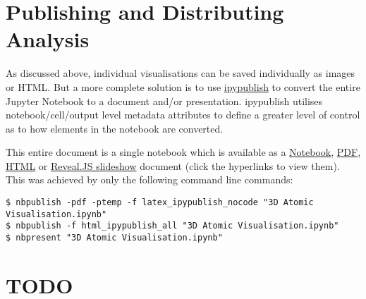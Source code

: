 \documentclass[10pt,parskip=half,
	toc=sectionentrywithdots,
	bibliography=totocnumbered,
	captions=tableheading,numbers=noendperiod]{scrartcl}
\begin{document}
\section{Publishing and Distributing
Analysis}\label{publishing-and-distributing-analysis}

As discussed above, individual visualisations can be saved individually
as images or HTML. But a more complete solution is to use
\href{https://github.com/chrisjsewell/ipypublish}{ipypublish} to convert
the entire Jupyter Notebook to a document and/or presentation.
ipypublish utilises notebook/cell/output level metadata attributes to
define a greater level of control as to how elements in the notebook are
converted.

This entire document is a single notebook which is available as a
\href{https://github.com/chrisjsewell/chrisjsewell.github.io/blob/master/3d_atomic/3D\%20Atomic\%20Visualisation.ipynb}{Notebook},
\href{https://chrisjsewell.github.io/3d_atomic/converted/3D\%20Atomic\%20Visualisation.view_pdf.html}{PDF},
\href{https://chrisjsewell.github.io/3d_atomic/converted/3D\%20Atomic\%20Visualisation.html}{HTML}
or
\href{https://chrisjsewell.github.io/3d_atomic/converted/3D\%20Atomic\%20Visualisation.slides.html}{Reveal.JS
slideshow} document (click the hyperlinks to view them). This was
achieved by only the following command line commands:

\begin{verbatim}
$ nbpublish -pdf -ptemp -f latex_ipypublish_nocode "3D Atomic Visualisation.ipynb"
$ nbpublish -f html_ipypublish_all "3D Atomic Visualisation.ipynb"
$ nbpresent "3D Atomic Visualisation.ipynb"
\end{verbatim}

\section{TODO}\label{todo}
\end{document}
